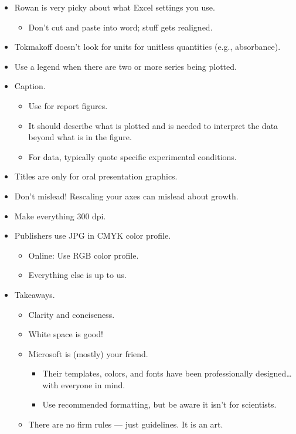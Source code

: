 \documentclass[../notes.tex]{subfiles}
\begin{document}
\begin{itemize}
    \item Rowan is very picky about what Excel settings you use.
    \begin{itemize}
        \item Don't cut and paste into word; stuff gets realigned.
    \end{itemize}
    \item Tokmakoff doesn't look for units for unitless quantities (e.g., absorbance).
    \item Use a legend when there are two or more series being plotted.
    \item Caption.
    \begin{itemize}
        \item Use for report figures.
        \item It should describe what is plotted and is needed to interpret the data beyond what is in the figure.
        \item For data, typically quote specific experimental conditions.
    \end{itemize}
    \item Titles are only for oral presentation graphics.
    \item Don't mislead! Rescaling your axes can mislead about growth.
    \item Make everything 300 dpi.
    \item Publishers use JPG in CMYK color profile.
    \begin{itemize}
        \item Online: Use RGB color profile.
        \item Everything else is up to us.
    \end{itemize}
    \item Takeaways.
    \begin{itemize}
        \item Clarity and conciseness.
        \item White space is good!
        \item Microsoft is (mostly) your friend.
        \begin{itemize}
            \item Their templates, colors, and fonts have been professionally designed\dots with everyone in mind.
            \item Use recommended formatting, but be aware it isn't for scientists.
        \end{itemize}
        \item There are no firm rules --- just guidelines. It is an art.
    \end{itemize}
\end{itemize}
\end{document}
